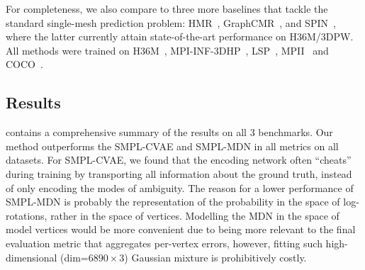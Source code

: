 For completeness, we also compare to three more baselines that tackle the standard single-mesh prediction problem:
HMR~\cite{kanazawa18end-to-end}, GraphCMR~\cite{pavlakos18learning}, and SPIN~\cite{kolotouros19learning}, where the latter currently attain state-of-the-art performance on H36M/3DPW. All methods were trained on H36M~\cite{ionescu2013human3}, MPI-INF-3DHP~\cite{mono-3dhp2017}, LSP~\cite{Johnson11}, MPII~\cite{andriluka14cvpr} and COCO~\cite{lin2014microsoft}.



% 


\subsection{Results}\label{s:exp_results}
 contains a comprehensive summary of the results on all 3 benchmarks. Our method outperforms the SMPL-CVAE and SMPL-MDN in all metrics on all datasets.
For SMPL-CVAE, we found that the encoding network often ``cheats'' during training by transporting all information about the ground truth, instead of only encoding the modes of ambiguity.
The reason for a lower performance of SMPL-MDN is probably the representation of the probability in the space of log-rotations, rather in the space of vertices.
Modelling the MDN in the space of model vertices would be more convenient due to being more relevant to the final evaluation metric that aggregates per-vertex errors, however, fitting such high-dimensional (dim=$6890 \times 3$) Gaussian mixture is prohibitively costly. 

